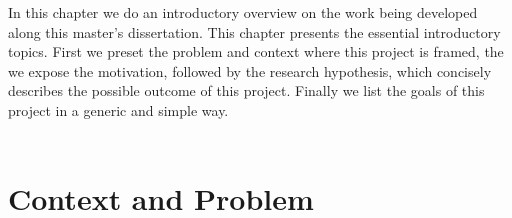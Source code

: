 In this chapter we do an introductory overview on the work being developed along this master's dissertation. This chapter presents the essential introductory topics. First we preset the problem and context where this project is framed, the we expose the motivation, followed by the research hypothesis, which concisely describes the possible outcome of this project. Finally we list the goals of this project in a generic and simple way.\\\\

\section{Context and Problem}

